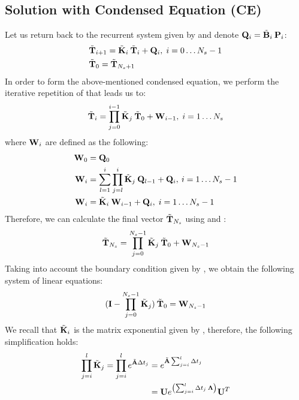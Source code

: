 \subsection{Solution with Condensed Equation (CE)} \label{sec:ce-solution}
Let us return back to the recurrent system given by  and denote \mbox{$\mathbf{Q}_i = \tilde{\mathbf{B}}_i \: \mathbf{P}_i$}:
\begin{align}
  & \tilde{\mathbf{T}}_{i + 1} = \tilde{\mathbf{K}}_i \: \tilde{\mathbf{T}}_i + \mathbf{Q}_i, \; i = 0 \dots N_s - 1 \label{eq:ce-recurrent} \\
  & \tilde{\mathbf{T}}_0 = \tilde{\mathbf{T}}_{N_s + 1} \nonumber
\end{align}
In order to form the above-mentioned condensed equation, we perform the iterative repetition of  that leads us to:
\begin{equation} \label{eq:y-recurrent}
  \tilde{\mathbf{T}}_i = \prod_{j = 0}^{i - 1} \tilde{\mathbf{K}}_j \: \tilde{\mathbf{T}}_0 + \mathbf{W}_{i - 1}, \; i = 1 \dots N_s
\end{equation}
where $\mathbf{W}_i$ are defined as the following:
\begin{align}
  \mathbf{W}_0 & = \mathbf{Q}_0 \nonumber \\
  \mathbf{W}_i & = \sum_{l = 1}^i \prod_{j = l}^i \tilde{\mathbf{K}}_j \: \mathbf{Q}_{l - 1} + \mathbf{Q}_i, \: i = 1 \dots N_s - 1 \nonumber \\
  \mathbf{W}_i & = \tilde{\mathbf{K}}_i \: \mathbf{W}_{i - 1} + \mathbf{Q}_i, \; i = 1 \dots N_s - 1 \label{eq:p-recurrent}
\end{align}
Therefore, we can calculate the final vector $\tilde{\mathbf{T}}_{N_s}$ using  and :
\[
  \tilde{\mathbf{T}}_{N_s} = \prod_{j = 0}^{N_s - 1} \tilde{\mathbf{K}}_j \: \tilde{\mathbf{T}}_0 + \mathbf{W}_{N_s - 1}
\]
Taking into account the boundary condition given by , we obtain the following system of linear equations:
\begin{equation} \label{eq:core-system}
  (\mathbf{I} - \prod_{j = 0}^{N_s - 1} \tilde{\mathbf{K}}_j) \: \tilde{\mathbf{T}}_0 = \mathbf{W}_{N_s - 1}
\end{equation}
We recall that $\tilde{\mathbf{K}}_i$ is the matrix exponential given by , therefore, the following simplification holds:
\begin{align*}
  \prod_{j = i}^l \tilde{\mathbf{K}}_j = \prod_{j = i}^l e^{\tilde{\mathbf{A}} \Delta t_j} & = e^{\tilde{\mathbf{A}} \sum_{j = i}^l \Delta t_j} \\
  & = \mathbf{U} e^{\left( \sum_{j = i}^l \Delta t_j \: \mathbf{\Lambda} \right)} \mathbf{U}^T
\end{align*}
